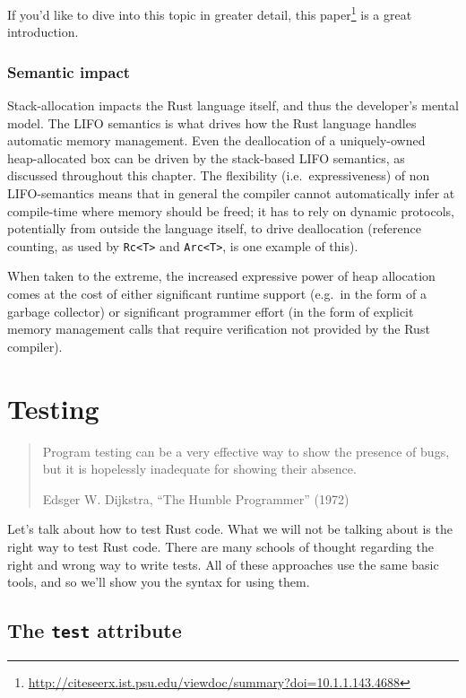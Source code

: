 \documentclass[a4paper,]{book}
\renewcommand*{\hypertarget}[3][\ar]{%
  \def\ar{#2}%
  \label{#1}%
  #3}
\renewcommand{\href}[2]{#2\footnote{\url{#1}}}
\begin{document}
If you'd like to dive into this topic in greater detail,
\href{http://citeseerx.ist.psu.edu/viewdoc/summary?doi=10.1.1.143.4688}{this
paper} is a great introduction.

\subsubsection{Semantic impact}\label{semantic-impact}

Stack-allocation impacts the Rust language itself, and thus the
developer's mental model. The LIFO semantics is what drives how the Rust
language handles automatic memory management. Even the deallocation of a
uniquely-owned heap-allocated box can be driven by the stack-based LIFO
semantics, as discussed throughout this chapter. The flexibility
(i.e.~expressiveness) of non LIFO-semantics means that in general the
compiler cannot automatically infer at compile-time where memory should
be freed; it has to rely on dynamic protocols, potentially from outside
the language itself, to drive deallocation (reference counting, as used
by \texttt{Rc\textless{}T\textgreater{}} and
\texttt{Arc\textless{}T\textgreater{}}, is one example of this).

When taken to the extreme, the increased expressive power of heap
allocation comes at the cost of either significant runtime support
(e.g.~in the form of a garbage collector) or significant programmer
effort (in the form of explicit memory management calls that require
verification not provided by the Rust compiler).

\hypertarget{sec--testing}{\section{Testing}\label{sec--testing}}

\begin{quote}
Program testing can be a very effective way to show the presence of
bugs, but it is hopelessly inadequate for showing their absence.

Edsger W. Dijkstra, ``The Humble Programmer'' (1972)
\end{quote}

Let's talk about how to test Rust code. What we will not be talking
about is the right way to test Rust code. There are many schools of
thought regarding the right and wrong way to write tests. All of these
approaches use the same basic tools, and so we'll show you the syntax
for using them.

\subsection{\texorpdfstring{The \texttt{test}
attribute}{The test attribute}}\label{the-test-attribute}
\end{document}
